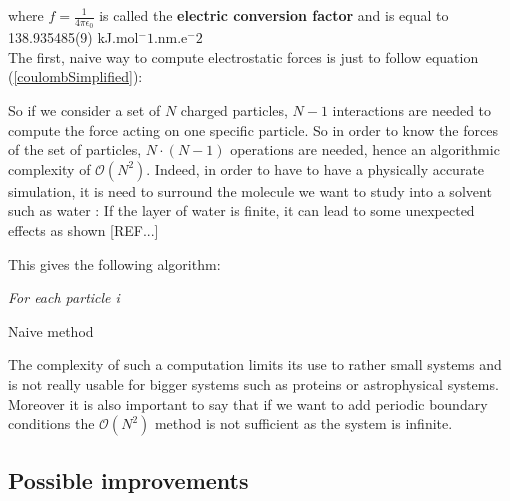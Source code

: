 \documentclass[12pt,twoside,a4paper]{report}
\begin{document}
where $f=\frac{1}{4\pi\epsilon_0}$ is called the \textbf{electric conversion factor} and is equal to 138.935485(9) kJ.mol$^-1$.nm.e$^-2$\\


The first, naive way to compute electrostatic forces is just to follow equation (\ref{coulombSimplified}):

So if we consider a set of $N$ charged particles, $N-1$ interactions are needed to compute the force acting on one specific particle. So in order to know the forces of the set of particles, $N\cdot(N-1)$ operations are needed, hence an algorithmic complexity of $\mathcal{O}(N^2)$. Indeed, in order to have to have a physically accurate simulation, it is need to surround the molecule we want to study into a solvent such as water : If the layer of water is finite, it can lead to some unexpected effects as shown [REF...]


This gives the following algorithm:

\IncMargin{1em}
\begin{algorithm}[H]



\BlankLine

\emph{For each particle i}\;
\caption{Naive method}\label{algo_disjdecomp}
\end{algorithm}\DecMargin{1em}


The complexity of such a computation limits its use to rather small systems and is not really usable for bigger systems such as proteins or astrophysical systems.
 Moreover it is also important to say that if we want to add periodic boundary conditions the $\mathcal{O}(N^2)$ method is not sufficient as the system is infinite.


\subsection{Possible improvements}
\end{document}

